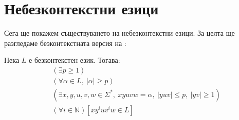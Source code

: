 \section{Небезконтекстни езици}

Сега ще покажем съществуването на небезконтекстни езици.
За целта ще разгледаме безконтекстната версия на :

\begin{lemma}
    Нека $L$ е безконтекстен език. Тогава:
    \begin{align*}
         & (\exists p \geq 1)                                                                       \\
         & (\forall \alpha \in L, \: |\alpha| \geq p)                                               \\
         & (\exists x, y, u, v, w \in \Sigma^*, \: xyuvw = \alpha, \: |yuv| \leq p, \: |yv| \geq 1) \\
         & (\forall i \in \mathbb{N}) [xy^iuv^iw \in L]
    \end{align*}
\end{lemma}

